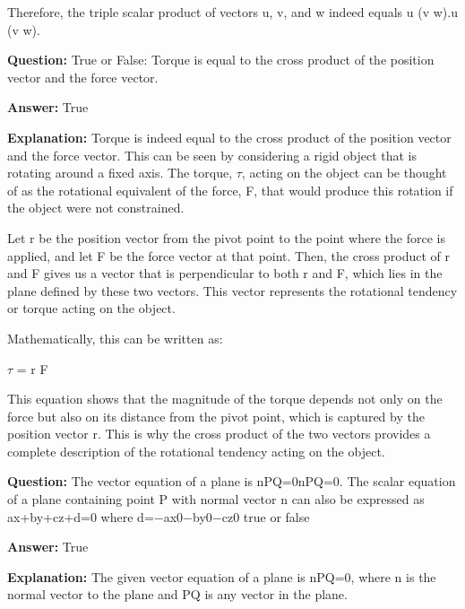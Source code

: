 \documentclass{article}
\begin{document}
Therefore, the triple scalar product of vectors u, v, and w indeed equals u {\textperiodcentered} (v {\texttimes} w).u {\textperiodcentered} (v {\texttimes} w).
                
                \vspace{0.5cm} 
        
            
                \textbf {Question:} True or False: Torque is equal to the cross product of the position vector and the force vector.
                
                \textbf{Answer:} True

                \textbf{Explanation:} Torque is indeed equal to the cross product of the position vector and the force vector. This can be seen by considering a rigid object that is rotating around a fixed axis. The torque, \ensuremath{\tau}, acting on the object can be thought of as the rotational equivalent of the force, F, that would produce this rotation if the object were not constrained.

Let r be the position vector from the pivot point to the point where the force is applied, and let F be the force vector at that point. Then, the cross product of r and F gives us a vector that is perpendicular to both r and F, which lies in the plane defined by these two vectors. This vector represents the rotational tendency or torque acting on the object.

Mathematically, this can be written as:

\ensuremath{\tau} = r {\texttimes} F

This equation shows that the magnitude of the torque depends not only on the force but also on its distance from the pivot point, which is captured by the position vector r. This is why the cross product of the two vectors provides a complete description of the rotational tendency acting on the object.
                
                \vspace{0.5cm} 
        
            
                \textbf {Question:} The vector equation of a plane is n{\textperiodcentered}PQ{\textrightarrow}=0n{\textperiodcentered}PQ{\textrightarrow}=0. The scalar equation of a plane containing point P with normal vector n can also be expressed as ax+by+cz+d=0 where d=\ensuremath{-}ax0\ensuremath{-}by0\ensuremath{-}cz0 true or false
                
                \textbf{Answer:} True

                \textbf{Explanation:} The given vector equation of a plane is n{\textperiodcentered}PQ{\textrightarrow}=0, where n is the normal vector to the plane and PQ{\textrightarrow} is any vector in the plane.
\end{document}
